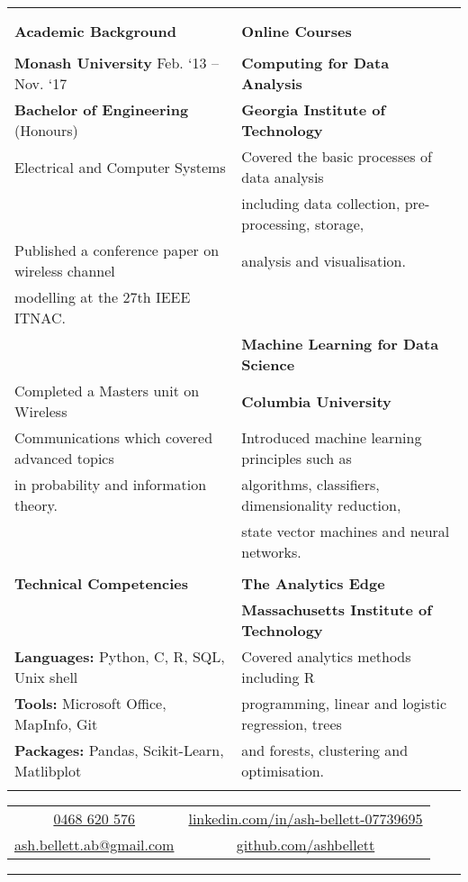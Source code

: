 \documentclass{letter}
\begin{document}
\begin{center}
\begin{tabularx}{\textwidth}{X | X}
	 & \\
	 \cline{1-1}
	 \cline{2-2}
	 & \\
	\Large \textbf{Academic Background} & \Large \textbf{Online Courses}\\
	 & \\
	\textbf{Monash University} \hfill Feb. `13 -- Nov. `17 & \textbf{Computing for Data Analysis}\\
	\textbf{Bachelor of Engineering} (Honours) & \textbf{Georgia Institute of Technology}\\
	Electrical and Computer Systems & Covered the basic processes of data analysis\\
	 & including data collection, pre-processing, storage,\\
	Published a conference paper on wireless channel & analysis and visualisation.\\
	modelling at the 27th IEEE ITNAC. & \\
	 & \textbf{Machine Learning for Data Science}\\
	Completed a Masters unit on Wireless & \textbf{Columbia University}\\
	Communications which covered advanced topics & Introduced machine learning principles such as\\
	in probability and information theory. & algorithms, classifiers, dimensionality reduction,\\
	 & state vector machines and neural networks.\\
	\cline{1-1}
	 & \\
	\Large \textbf{Technical Competencies} & \textbf{The Analytics Edge}\\
	 & \textbf{Massachusetts Institute of Technology}\\
	\textbf{Languages:} Python, C, R, SQL, Unix shell & Covered analytics methods including R\\
	\textbf{Tools:} Microsoft Office, MapInfo, Git & programming, linear and logistic regression, trees\\ 
	\textbf{Packages:} Pandas, Scikit-Learn, Matlibplot & and forests, clustering and optimisation.\\
	 & \\
	\cline{1-1}
	\cline{2-2}
	\end{tabularx}
	\end{center}
	\begin{center}
	\begin{tabular}{cc}
	\href{tel:61468620576}{0468 620 576} & \href{https://www.linkedin.com/in/ash-bellett-07739695}{linkedin.com/in/ash-bellett-07739695}\\
	\href{mailto:ash.bellett.ab@gmail.com}{ash.bellett.ab@gmail.com} & \href{https://www.github.com/ashbellett}{github.com/ashbellett}
	\end{tabular}
	\end{center}
	\rule{\textwidth}{2mm}
	
\end{document}
